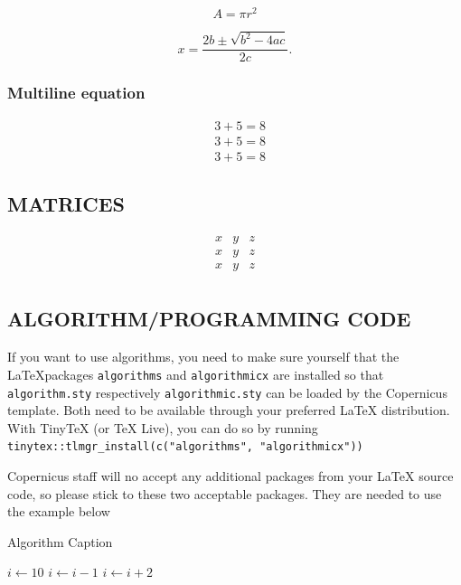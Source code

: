 \documentclass[gmd, manuscript]{copernicus}
\begin{document}
\begin{equation}
A = \pi r^2
\end{equation}

\begin{equation}
x=\frac{2b\pm\sqrt{b^{2}-4ac}}{2c}.  
\end{equation}

\subsubsection{Multiline equation}

\begin{align}
& 3 + 5 = 8\\
& 3 + 5 = 8\\
& 3 + 5 = 8
\end{align}

\subsection{MATRICES}

\[
\begin{matrix}
x & y & z\\
x & y & z\\
x & y & z\\
\end{matrix}
\]

\subsection{ALGORITHM/PROGRAMMING CODE}

If you want to use algorithms, you need to make sure yourself that the
\LaTeX packages \texttt{algorithms} and \texttt{algorithmicx} are
installed so that \texttt{algorithm.sty} respectively
\texttt{algorithmic.sty} can be loaded by the Copernicus template. Both
need to be available through your preferred \LaTeX{} distribution. With
TinyTeX (or TeX Live), you can do so by running
\texttt{tinytex::tlmgr\_install(c("algorithms",\ "algorithmicx"))}

Copernicus staff will no accept any additional packages from your LaTeX
source code, so please stick to these two acceptable packages. They are
needed to use the example below

\begin{algorithm}
\caption{Algorithm Caption}
\label{a1}
\begin{algorithmic}
\STATE $i\gets 10$
        \STATE $i\gets i-1$
\ELSE
                \STATE $i\gets i+2$
        \ENDIF
\ENDIF
\end{algorithmic}
\end{algorithm}
\end{document}

